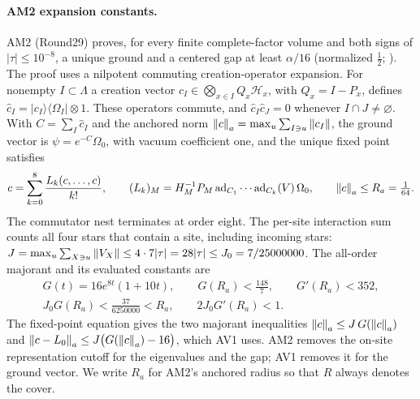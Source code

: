 \paragraph{AM2 expansion constants.}
AM2 (Round29) proves, for every finite complete-factor volume and both signs of
$|\tau|\le10^{-8}$, a unique ground and a centered gap at least $\alpha/16$
(normalized $\tfrac12$; ). The proof uses a nilpotent commuting
creation-operator expansion. For nonempty $I\subset\Lambda$ a creation vector
$c_I\in\bigotimes_{x\in I}Q_x\mathcal H_x$, with $Q_x=I-P_x$, defines
$\hat c_I=|c_I\rangle\langle\Omega_I|\otimes1$. These operators commute, and
$\hat c_I\hat c_J=0$ whenever $I\cap J\ne\varnothing$. With
$C=\sum_I\hat c_I$ and the anchored norm
$\left\lVert c\right\rVert_a=\max_u\sum_{I\ni u}\left\lVert c_I\right\rVert$, the ground vector is
$\psi=e^{-C}\Omega_0$, with vacuum coefficient one, and the unique fixed point
satisfies
\begin{equation}
 c=\sum_{k=0}^{8}\frac{L_k(c,\ldots,c)}{k!},\qquad
 (L_k)_M=H_M^{-1}P_M\,\mathrm{ad}_{C_1}\cdots\mathrm{ad}_{C_k}(V)\,\Omega_0,\qquad
 \left\lVert c\right\rVert_a\le R_a=\tfrac1{64}.
 \label{eq:dict-fixed}
\end{equation}
The commutator nest terminates at order eight. The per-site interaction sum
counts all four stars that contain a site, including incoming stars:
$J=\max_u\sum_{X\ni u}\left\lVert V_X\right\rVert\le4\cdot7|\tau|=28|\tau|\le
J_0=7/25000000$. The all-order majorant and its evaluated constants are
\begin{equation}
 \begin{gathered}
 G(t)=16e^{8t}(1+10t),\qquad G(R_a)<\tfrac{148}{7},\qquad G'(R_a)<352,\\
 J_0G(R_a)<\tfrac{37}{6250000}<R_a,\qquad 2J_0G'(R_a)<1 .
 \end{gathered}
 \label{eq:dict-majorant}
\end{equation}
The fixed-point equation gives the two majorant inequalities
$\left\lVert c\right\rVert_a\le J\,G(\left\lVert c\right\rVert_a)$ and
$\left\lVert c-L_0\right\rVert_a\le J\bigl(G(\left\lVert c\right\rVert_a)-16\bigr)$, which AV1 uses. AM2 removes
the on-site representation cutoff for the eigenvalues and the gap; AV1 removes
it for the ground vector. We write $R_a$ for AM2's anchored radius so that $R$
always denotes the cover.

